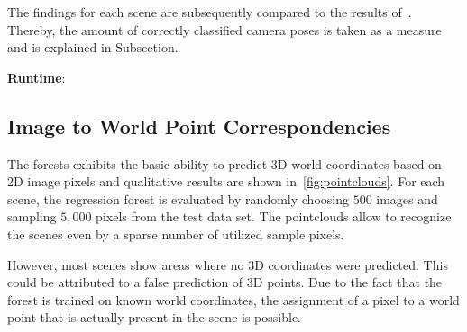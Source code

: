 \documentclass[final]{cvpr}
\begin{document}
The findings for each scene are subsequently compared
to the results of~\cite{shotton2013}. Thereby, the amount of correctly classified camera poses is taken as a measure 
and is explained in Subsection.

\textbf{Runtime}: 



\subsection{Image to World Point Correspondencies}
The forests exhibits the basic ability to predict 3D world coordinates based on 2D image pixels and 
qualitative results are shown in~\ref{fig:pointclouds}. For each scene, the regression forest is evaluated by 
randomly choosing $500$ images and sampling $5,000$ pixels from the test data set. The pointclouds 
allow to recognize the scenes even by a sparse number of utilized sample pixels. 

However, most scenes show areas where no 3D coordinates
were predicted. This could be attributed to a false prediction of 3D points. Due to the fact that the forest is 
trained on known world coordinates, the assignment of a pixel to a world point that is actually present in the 
scene is possible. 
\end{document}
